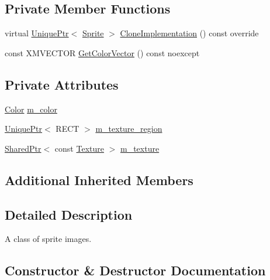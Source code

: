 \subsection*{Private Member Functions}
\begin{DoxyCompactItemize}
\item 
virtual \hyperlink{namespacemage_a3316d7143a973e37adf1110f2e80ca31}{Unique\+Ptr}$<$ \hyperlink{classmage_1_1_sprite}{Sprite} $>$ \hyperlink{classmage_1_1_sprite_image_ad6460971fc4ffb425b7a43d27c9b05b2}{Clone\+Implementation} () const override
\item 
const X\+M\+V\+E\+C\+T\+OR \hyperlink{classmage_1_1_sprite_image_a65e6a26e2589afa2c6ccc463e7dd4264}{Get\+Color\+Vector} () const noexcept
\end{DoxyCompactItemize}
\subsection*{Private Attributes}
\begin{DoxyCompactItemize}
\item 
\hyperlink{structmage_1_1_color}{Color} \hyperlink{classmage_1_1_sprite_image_a63331a3170f5af1a14b15913afc59ce2}{m\+\_\+color}
\item 
\hyperlink{namespacemage_a3316d7143a973e37adf1110f2e80ca31}{Unique\+Ptr}$<$ R\+E\+CT $>$ \hyperlink{classmage_1_1_sprite_image_a8d20ef6d6470dc01f73a599060953b65}{m\+\_\+texture\+\_\+region}
\item 
\hyperlink{namespacemage_a1e01ae66713838a7a67d30e44c67703e}{Shared\+Ptr}$<$ const \hyperlink{classmage_1_1_texture}{Texture} $>$ \hyperlink{classmage_1_1_sprite_image_ac0b448632850419c9df66caf887ca09f}{m\+\_\+texture}
\end{DoxyCompactItemize}
\subsection*{Additional Inherited Members}


\subsection{Detailed Description}
A class of sprite images. 

\subsection{Constructor \& Destructor Documentation}
\hypertarget{classmage_1_1_sprite_image_ad57c748cdc09bdf57ef22613c3841e72}{}\label{classmage_1_1_sprite_image_ad57c748cdc09bdf57ef22613c3841e72} 
